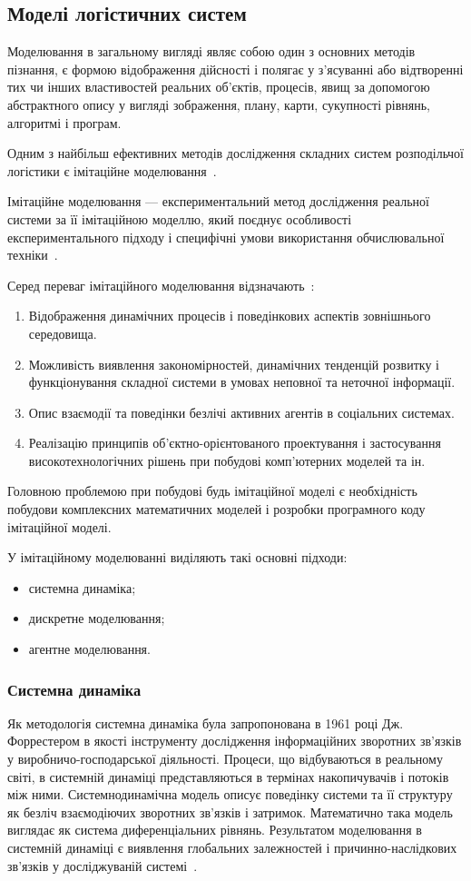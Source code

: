 \subsection{Моделі логістичних систем}
Моделювання в загальному вигляді являє собою один з основних методів пізнання, є формою відображення дійсності і полягає у з'ясуванні або відтворенні тих чи інших властивостей реальних об'єктів, процесів, явищ за допомогою абстрактного опису у вигляді зображення, плану, карти, сукупності рівнянь, алгоритмі і програм.

Одним з найбільш ефективних методів дослідження складних систем розподільчої логістики є імітаційне моделювання~\cite{Kobelev2003}.

Імітаційне моделювання --- експериментальний метод дослідження реальної системи за її імітаційною моделлю, який поєднує особливості експериментального підходу і специфічні умови використання обчислювальної техніки~\cite{Emelyanov2002}.

Серед переваг імітаційного моделювання відзначають~\cite{Emelyanov2002}:
\begin{enumerate}
	\item Відображення динамічних процесів і поведінкових аспектів зовнішнього середовища.
	\item Можливість виявлення закономірностей, динамічних тенденцій розвитку і функціонування складної системи в умовах неповної та неточної інформації.
	\item Опис взаємодії та поведінки безлічі активних агентів в соціальних системах.
	\item Реалізацію принципів об'єктно-орієнтованого проектування і застосування високотехнологічних рішень при побудові комп'ютерних моделей та ін.
\end{enumerate}

Головною проблемою при побудові будь імітаційної моделі є необхідність побудови комплексних математичних моделей і розробки програмного коду імітаційної моделі.

У імітаційному моделюванні виділяють такі основні підходи:
\begin{itemize}
	\item системна динаміка;
	\item дискретне моделювання;
	\item агентне моделювання.
\end{itemize}

\subsubsection{Системна динаміка}
Як методологія системна динаміка була запропонована в 1961 році Дж. Форрестером в якості інструменту дослідження інформаційних зворотних зв'язків у виробничо-господарської діяльності.
Процеси, що відбуваються в реальному світі, в системній динаміці представляються в термінах накопичувачів і потоків між ними.
Системнодинамічна модель описує поведінку системи та її структуру як безліч взаємодіючих зворотних зв'язків і затримок.
Математично така модель виглядає як система диференціальних рівнянь.
Результатом моделювання в системній динаміці є виявлення глобальних залежностей і причинно-наслідкових зв'язків у досліджуваній системі~\cite{Shamrin2016}.


